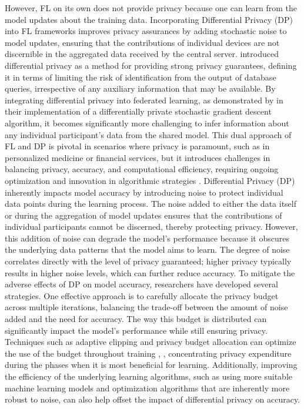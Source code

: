 However, FL on its own does not provide privacy because one can learn from the model updates about the training data. Incorporating Differential Privacy (DP) \cite{McMahan2016CommunicationEfficientLO} into FL frameworks improves privacy assurances by adding stochastic noise to model updates, ensuring that the contributions of individual devices are not discernible in the aggregated data received by the central server. \cite{Dwork2006CalibratingNT} introduced differential privacy as a method for providing strong privacy guarantees, defining it in terms of limiting the risk of identification from the output of database queries, irrespective of any auxiliary information that may be available. By integrating differential privacy into federated learning, as demonstrated by \cite{Abadi2016DeepLW} in their implementation of a differentially private stochastic gradient descent algorithm, it becomes significantly more challenging to infer information about any individual participant's data from the shared model. This dual approach of FL and DP is pivotal in scenarios where privacy is paramount, such as in personalized medicine or financial services, but it introduces challenges in balancing privacy, accuracy, and computational efficiency, requiring ongoing optimization and innovation in algorithmic strategies \cite{Geyer2017DifferentiallyPF}.
Differential Privacy (DP) \cite{Dwork2014TheAF} inherently impacts model accuracy by introducing noise to protect individual data points during the learning process. The noise added to either the data itself or during the aggregation of model updates ensures that the contributions of individual participants cannot be discerned, thereby protecting privacy. However, this addition of noise can degrade the model's performance because it obscures the underlying data patterns that the model aims to learn. The degree of noise correlates directly with the level of privacy guaranteed; higher privacy typically results in higher noise levels, which can further reduce accuracy. To mitigate the adverse effects of DP on model accuracy, researchers have developed several strategies. One effective approach is to carefully allocate the privacy budget across multiple iterations, balancing the trade-off between the amount of noise added and the need for accuracy. The way this budget is distributed can significantly impact the model's performance while still ensuring privacy. Techniques such as adaptive clipping and privacy budget allocation can optimize the use of the budget throughout training \cite{Xia2022DifferentiallyPL}, \cite{Hong2021DynamicPB}, concentrating privacy expenditure during the phases when it is most beneficial for learning. Additionally, improving the efficiency of the underlying learning algorithms, such as using more suitable machine learning models and optimization algorithms that are inherently more robust to noise, can also help offset the impact of differential privacy on accuracy.

